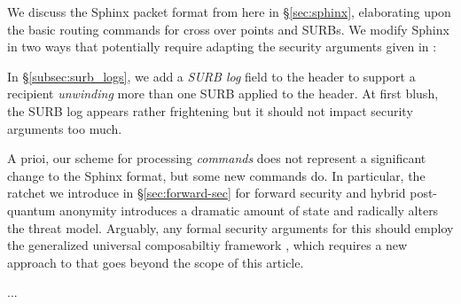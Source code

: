 We discuss the Sphinx packet format from \cite{Sphinx} here in
\S\ref{sec:sphinx}, elaborating upon the basic routing commands
for cross over points and SURBs.
%
We modify Sphinx in two ways that potentially require adapting
the security arguments given in \cite{FormalOnion}: 

In \S\ref{subsec:surb_logs}, we add a {\em SURB log} field to the
header to support a recipient {\em unwinding} more than one SURB
applied to the header.  At first blush, the SURB log appears rather
frightening but it should not impact security arguments too much.

A prioi, our scheme for processing {\em commands} does not represent
a significant change to the Sphinx format, but some new commands do.
In particular, the ratchet we introduce in \S\ref{sec:forward-sec}
for forward security and hybrid post-quantum anonymity introduces a
dramatic amount of state and radically alters the threat model.
Arguably, any formal security arguments for this should employ the 
generalized universal composabiltiy framework \cite{GenUC}, which
requires a new approach to \cite{FormalOnion} that goes beyond the
scope of this article. 

...


